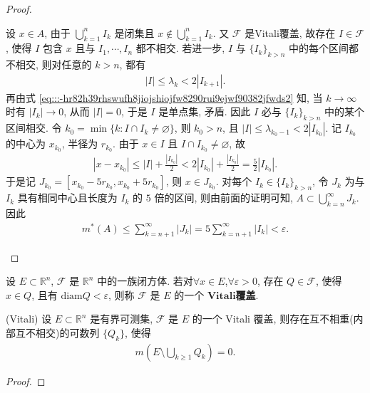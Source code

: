 \documentclass[../../main.tex]{subfiles}%
\begin{document}
\begin{proof}
\begin{enumerate}[(1)]
设 $x\in A$, 由于 $\bigcup_{k=1}^n I_k$ 是闭集且 $x\notin\bigcup_{k=1}^n I_k$. 又 $\mathcal{F}$ 是Vitali覆盖, 故存在 $I\in\mathcal{F}$, 使得 $I$ 包含 $x$ 且与 $I_1,\cdots,I_n$ 都不相交. 若进一步, $I$ 与 $\{I_k\}_{k>n}$ 中的每个区间都不相交, 则对任意的 $k>n$, 都有
\begin{align*}
|I|\leqslant\lambda_k<2|I_{k+1}|.
\end{align*}
再由式 \eqref{eq:::-hr82h39rhswufh8jiojshiojfw8290rui9ejwf90382jfwds2} 知, 当 $k\to\infty$ 时有 $|I_k|\to 0$, 从而 $|I|=0$, 于是 $I$ 是单点集, 矛盾. 因此 $I$ 必与 $\{I_k\}_{k>n}$ 中的某个区间相交. 令 $k_0=\min\{k:I\cap I_k\neq\varnothing \}$, 则 $k_0>n$, 且 $|I|\leqslant\lambda_{k_0-1}<2|I_{k_0}|$. 记 $I_{k_0}$ 的中心为 $x_{k_0}$, 半径为 $r_{k_0}$. 由于 $x\in I$ 且 $I\cap I_{k_0}\neq\varnothing $, 故
\begin{align*}
|x-x_{k_0}|\leqslant|I|+\frac{|I_{k_0}|}{2}<2|I_{k_0}|+\frac{|I_{k_0}|}{2}=\frac{5}{2}|I_{k_0}|.
\end{align*}
于是记 $J_{k_0}=[x_{k_0}-5r_{k_0},x_{k_0}+5r_{k_0}]$, 则 $x\in J_{k_0}$. 对每个 $I_k\in\{I_k\}_{k>n}$, 令 $J_k$ 为与 $I_k$ 具有相同中心且长度为 $I_k$ 的 $5$ 倍的区间, 则由前面的证明可知, $A\subset\bigcup_{k=n}^\infty J_k$. 因此
\begin{align*}
m^*(A)\leqslant\sum_{k=n+1}^\infty|J_k|=5\sum_{k=n+1}^\infty|I_k|<\varepsilon.
\end{align*}

\end{enumerate}

\end{proof}

\begin{definition}
设 $E\subset\mathbb{R}^n$, $\mathcal{F}$ 是 $\mathbb{R}^n$ 中的一族闭方体. 若对$\forall x\in E$,$\forall \varepsilon>0$, 存在 $Q\in\mathcal{F}$, 使得 $x\in Q$, 且有 $\mathrm{diam}Q<\varepsilon$, 则称 $\mathcal{F}$ 是 $E$ 的一个 $\mathbf{Vitali}$\textbf{覆盖}.
\end{definition}

\begin{proposition}
(Vitali) 设 $E\subset\mathbb{R}^n$ 是有界可测集, $\mathcal{F}$ 是 $E$ 的一个 Vitali 覆盖, 则存在互不相重(内部互不相交)的可数列 $\{Q_k\}$, 使得
\begin{align*}
m\!\left(E\setminus\bigcup_{k\geqslant 1} Q_k\right)=0.
\end{align*}
\end{proposition}
\begin{proof}



\end{proof}
\end{document}
